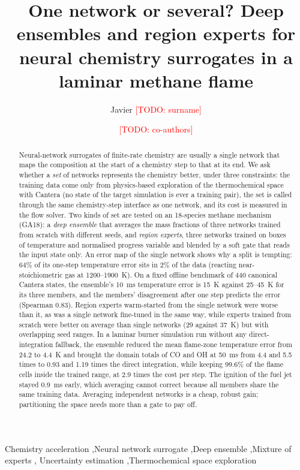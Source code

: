 \documentclass[preprint,review,12pt]{elsarticle}
\newcommand{\todo}[1]{\textcolor{red}{[TODO: #1]}}
\begin{document}
\begin{frontmatter}

\title{One network or several? Deep ensembles and region experts for neural chemistry surrogates in a
laminar methane flame}

\author[a]{Javier \todo{surname}}
\author[a]{\todo{co-authors}}
\address[a]{\todo{affiliation}}

\begin{abstract}
Neural-network surrogates of finite-rate chemistry are usually a single network that maps the
composition at the start of a chemistry step to that at its end. We ask whether a \emph{set} of networks
represents the chemistry better, under three constraints: the training data come only from
physics-based exploration of the thermochemical space with Cantera (no state of the target simulation is
ever a training pair), the set is called through the same chemistry-step interface as one network, and
its cost is measured in the flow solver. Two kinds of set are tested on an 18-species methane mechanism
(GA18): a \emph{deep ensemble} that averages the mass fractions of three networks trained from scratch
with different seeds, and \emph{region experts}, three networks trained on boxes of temperature and
normalised progress variable and blended by a soft gate that reads the input state only. An error map of
the single network shows why a split is tempting: 64\% of its one-step temperature error sits in 2\% of
the data (reacting near-stoichiometric gas at 1200--1900~K). On a fixed offline benchmark of 440
canonical Cantera states, the ensemble's 10~ms temperature error is 15~K against 25--45~K for its three
members, and the members' disagreement after one step predicts the error (Spearman 0.83). Region experts
warm-started from the single network were worse than it, as was a single network fine-tuned in the same
way, while experts trained from scratch were better on average than single networks (29 against 37~K)
but with overlapping seed ranges. In a laminar burner simulation run without any direct-integration
fallback, the ensemble reduced the mean flame-zone temperature error from 24.2 to 4.4~K and brought the
domain totals of CO and OH at 50~ms from 4.4 and 5.5 times to 0.93 and 1.19 times the direct integration, while
keeping 99.6\% of the flame cells inside the trained range, at 2.9 times the cost per step. The ignition
of the fuel jet stayed 0.9~ms early, which averaging cannot correct because all members share the same
training data. Averaging independent networks is a cheap, robust gain; partitioning the space needs more
than a gate to pay off.
\end{abstract}

\begin{keyword}
Chemistry acceleration \sep Neural network surrogate \sep Deep ensemble \sep Mixture of experts \sep
Uncertainty estimation \sep Thermochemical space exploration
\end{keyword}
\end{frontmatter}
\end{document}
